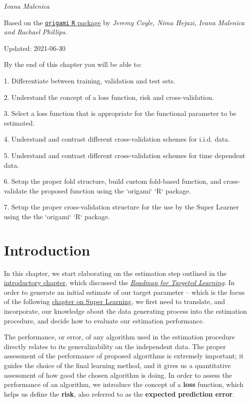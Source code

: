 \documentclass[12pt, krantz2,]{krantz}
\newcommand{\passthrough}[1]{#1}
\theoremstyle{definition}
\theoremstyle{definition}
\theoremstyle{definition}
\newcommand{\1}{\mathbbm{1}}
\begin{document}
\emph{Ivana Malenica}

Based on the \href{https://github.com/tlverse/origami}{\passthrough{\lstinline!origami!} \passthrough{\lstinline!R!} package}
by \emph{Jeremy Coyle, Nima Hejazi, Ivana Malenica and Rachael Phillips}.

Updated: 2021-06-30

\begin{VT1}



By the end of this chapter you will be able to:

1. Differentiate between training, validation and test sets.

2. Understand the concept of a loss function, risk and cross-validation.

3. Select a loss function that is appropriate for the functional parameter to be
   estimated.

4. Understand and contrast different cross-validation schemes for i.i.d. data.

5. Understand and contrast different cross-validation schemes for time dependent
   data.

6. Setup the proper fold structure, build custom fold-based function, and
   cross-validate the proposed function using the `origami` `R` package.

7. Setup the proper cross-validation structure for the use by the Super Learner
   using the the `origami` `R` package.

\end{VT1}

\hypertarget{introduction-1}{%
\section{Introduction}\label{introduction-1}}

In this chapter, we start elaborating on the estimation step outlined in the
\protect\hyperlink{intro}{introductory chapter}, which discussed the \protect\hyperlink{roadmap}{\emph{Roadmap for Targeted
Learning}}. In order to generate an initial estimate of our target
parameter -- which is the focus of the following \protect\hyperlink{sl3}{chapter on Super
Learning}, we first need to translate, and incorporate, our knowledge
about the data generating process into the estimation procedure, and decide how
to evaluate our estimation performance.

The performance, or error, of any algorithm used in the estimation procedure
directly relates to its generalizability on the independent data. The proper
assessment of the performance of proposed algorithms is extremely important; it
guides the choice of the final learning method, and it gives us a quantitative
assessment of how good the chosen algorithm is doing. In order to assess the
performance of an algorithm, we introduce the concept of a \textbf{loss} function,
which helps us define the \textbf{risk}, also referred to as the \textbf{expected
prediction error}.
\end{document}
